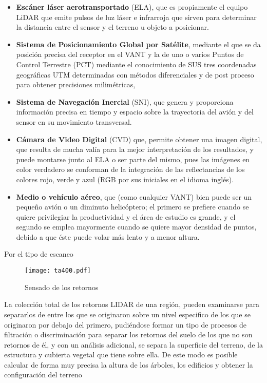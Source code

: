 \begin{itemize}
    \item \textbf{Escáner láser aerotransportado} (ELA), que es propiamente el equipo LiDAR que emite pulsos de luz láser e infrarroja que sirven para determinar la distancia entre el sensor y el terreno u objeto a posicionar.
    \item \textbf{Sistema de Posicionamiento Global por Satélite}, mediante el que se da posición precisa del receptor en el VANT y la de uno o varios Puntos de Control Terrestre (PCT) mediante el conocimiento de SUS tres coordenadas geográficas UTM determinadas con métodos diferenciales y de post proceso para obtener precisiones milimétricas,
    \item \textbf{Sistema de Navegación Inercial} (SNI), que genera y proporciona información precisa en tiempo y espacio sobre la trayectoria del avión y del sensor en su movimiento transversal.
    \item \textbf{Cámara de Video Digital} (CVD) que, permite obtener una imagen digital, que resulta de mucha valía para la mejor interpretación de los resultados, y puede montarse junto al ELA o ser parte del mismo, pues las imágenes en color verdadero se conforman de la integración de las reflectancias de los colores rojo, verde y azul (RGB por sus iniciales en el idioma inglés).
    \item \textbf{Medio o vehículo aéreo}, que (como cualquier VANT) bien puede ser un pequeño avión o un diminuto helicóptero; el primero se prefiere cuando se quiere privilegiar la productividad y el área de estudio es grande, y el segundo se emplea mayormente cuando se quiere mayor densidad de puntos, debido a que éste puede volar más lento y a menor altura.
\end{itemize}

%

Por el tipo de escaneo

\begin{figure}[h!]
    \centering
      \texttt{[image: ta400.pdf]}
      \caption{Sensado de los retornos}
      \label{ta400}
    \end{figure}
    La colección total de los retornos LIDAR de una región, pueden examinarse para separarlos de entre los que se originaron sobre un nivel especifico de los que se originaron por debajo del primero, pudiéndose formar un tipo de procesos de filtración o discriminación para separar los retornos del suelo de los que no son retornos de él, y con un análisis adicional, se separa la superficie del terreno, de la estructura y cubierta vegetal que tiene sobre ella. De este modo es posible calcular de forma muy precisa la altura de los árboles, los edificios y obtener la configuración del terreno

